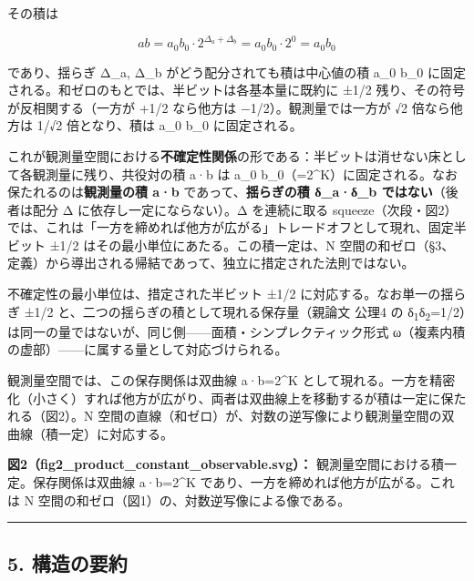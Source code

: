 \documentclass[11pt]{ltjsarticle}
\begin{document}
その積は

\[ab = a_0 b_0 \cdot 2^{\Delta_a + \Delta_b} = a_0 b_0 \cdot 2^{0} = a_0 b_0\]

であり、揺らぎ Δ\_a, Δ\_b がどう配分されても積は中心値の積 a\_0 b\_0
に固定される。和ゼロのもとでは、半ビットは各基本量に既約に ±1/2
残り、その符号が反相関する（一方が +1/2 なら他方は
−1/2）。観測量では一方が √2 倍なら他方は 1/√2 倍となり、積は a\_0 b\_0
に固定される。

これが観測量空間における\textbf{不確定性関係}の形である：半ビットは消せない床として各観測量に残り、共役対の積
a·b は a\_0
b\_0（=2\^{}K）に固定される。なお保たれるのは\textbf{観測量の積 a·b}
であって、\textbf{揺らぎの積 δ\_a·δ\_b ではない}（後者は配分 Δ
に依存し一定にならない）。Δ を連続に取る
squeeze（次段・図2）では、これは「一方を締めれば他方が広がる」トレードオフとして現れ、固定半ビット
±1/2 はその最小単位にあたる。この積一定は、N
空間の和ゼロ（§3、定義）から導出される帰結であって、独立に措定された法則ではない。

不確定性の最小単位は、措定された半ビット ±1/2
に対応する。なお単一の揺らぎ ±1/2
と、二つの揺らぎの積として現れる保存量（親論文 公理4 の
δ\textsubscript{1}δ\textsubscript{2}=1/2）は同一の量ではないが、同じ側------面積・シンプレクティック形式
ω（複素内積の虚部）------に属する量として対応づけられる。

観測量空間では、この保存関係は双曲線 a·b=2\^{}K
として現れる。一方を精密化（小さく）すれば他方が広がり、両者は双曲線上を移動するが積は一定に保たれる（図2）。N
空間の直線（和ゼロ）が、対数の逆写像により観測量空間の双曲線（積一定）に対応する。

\textbf{図2（fig2\_product\_constant\_observable.svg）：}
観測量空間における積一定。保存関係は双曲線 a·b=2\^{}K
であり、一方を締めれば他方が広がる。これは N
空間の和ゼロ（図1）の、対数逆写像による像である。

\begin{center}\rule{0.5\linewidth}{0.5pt}\end{center}

\subsection{5. 構造の要約}\label{ux69cbux9020ux306eux8981ux7d04}
\end{document}

